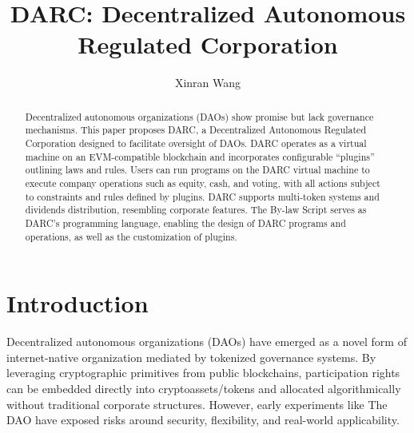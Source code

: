 \documentclass{article}
\title{DARC: Decentralized Autonomous Regulated Corporation}
\author{Xinran Wang}
\begin{document}
\maketitle


\begin{abstract}
Decentralized autonomous organizations (DAOs) show promise but lack governance mechanisms. This paper proposes DARC, a Decentralized Autonomous Regulated Corporation designed to facilitate oversight of DAOs. DARC operates as a virtual machine on an EVM-compatible blockchain and incorporates configurable ``plugins'' outlining laws and rules. Users can run programs on the DARC virtual machine to execute company operations such as equity, cash, and voting, with all actions subject to constraints and rules defined by plugins. DARC supports multi-token systems and dividends distribution, resembling corporate features. The By-law Script serves as DARC's programming language, enabling the design of DARC programs and operations, as well as the customization of plugins.
\end{abstract}

\section{Introduction}


Decentralized autonomous organizations (DAOs) have emerged as a novel form of internet-native organization mediated by tokenized governance systems. By leveraging cryptographic primitives from public blockchains, participation rights can be embedded directly into cryptoassets/tokens and allocated algorithmically without traditional corporate structures. However, early experiments like The DAO have exposed risks around security, flexibility, and real-world applicability.
\end{document}
